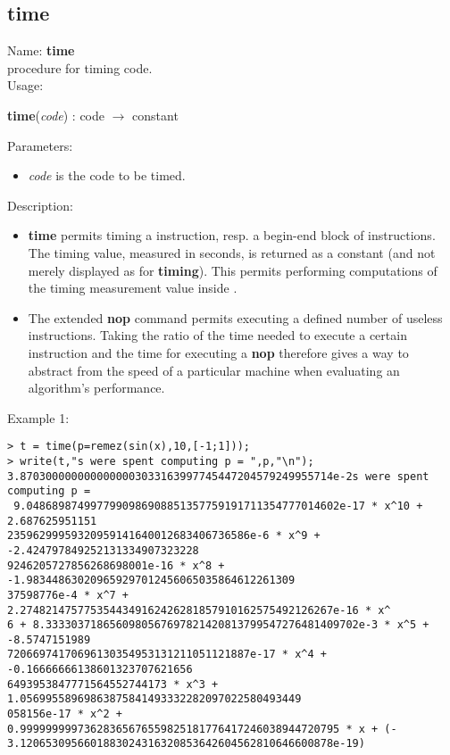\subsection{time}
\label{labtime}
\noindent Name: \textbf{time}\\
\phantom{aaa}procedure for timing \sollya code.\\[0.2cm]
\noindent Usage: 
\begin{center}
\textbf{time}(\emph{code}) : \textsf{code} $\rightarrow$ \textsf{constant}\\
\end{center}
Parameters: 
\begin{itemize}
\item \emph{code} is the code to be timed.
\end{itemize}
\noindent Description: \begin{itemize}

\item \textbf{time} permits timing a \sollya instruction, resp. a begin-end block
   of \sollya instructions. The timing value, measured in seconds, is returned
   as a \sollya constant (and not merely displayed as for \textbf{timing}). This 
   permits performing computations of the timing measurement value inside \sollya.

\item The extended \textbf{nop} command permits executing a defined number of
   useless instructions. Taking the ratio of the time needed to execute a
   certain \sollya instruction and the time for executing a \textbf{nop}
   therefore gives a way to abstract from the speed of a particular 
   machine when evaluating an algorithm's performance.
\end{itemize}
\noindent Example 1: 
\begin{center}\begin{minipage}{15cm}\begin{Verbatim}[frame=single]
> t = time(p=remez(sin(x),10,[-1;1]));
> write(t,"s were spent computing p = ",p,"\n");
3.8703000000000000003033163997745447204579249955714e-2s were spent computing p =
 9.0486898749977990986908851357759191711354777014602e-17 * x^10 + 2.687625951151
23596299959320959141640012683406736586e-6 * x^9 + -2.424797849252131334907323228
9246205727856268698001e-16 * x^8 + -1.983448630209659297012456065035864612261309
37598776e-4 * x^7 + 2.2748214757753544349162426281857910162575492126267e-16 * x^
6 + 8.3333037186560980567697821420813799547276481409702e-3 * x^5 + -8.5747151989
72066974170696130354953131211051121887e-17 * x^4 + -0.16666666138601323707621656
6493953847771564552744173 * x^3 + 1.05699558969863875841493332282097022580493449
058156e-17 * x^2 + 0.99999999973628365676559825181776417246038944720795 * x + (-
3.1206530956601883024316320853642604562810646600878e-19)
\end{Verbatim}
\end{minipage}\end{center}
